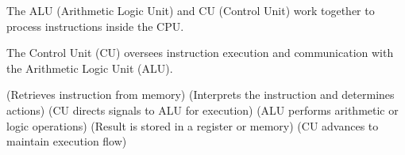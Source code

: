 \begin{NxSSSSBox}[breakable]
	\begin{NxIDBox}
		The ALU (Arithmetic Logic Unit) and CU (Control Unit) work together to process instructions inside the CPU.
	\end{NxIDBox}
	\begin{NxIDBox}
		The Control Unit (CU) oversees instruction execution and communication with the Arithmetic Logic Unit (ALU).
		\begin{NxListDark}
			 (Retrieves instruction from memory)
			 (Interprets the instruction and determines actions)
			 (CU directs signals to ALU for execution)
			 (ALU performs arithmetic or logic operations)
			 (Result is stored in a register or memory)
			 (CU advances to maintain execution flow)
		\end{NxListDark}
	\end{NxIDBox}
\end{NxSSSSBox}

\begin{comment}
\begin{NxCodeBox}{asm}{dark, sdwA, frmE, title={
}}

\end{NxCodeBox}

\bigskip
\end{comment}
